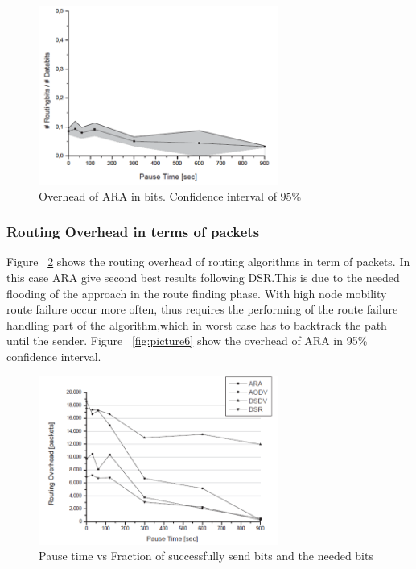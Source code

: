 \begin{figure}[t!]
\centering
\includegraphics[width=0.7\textwidth]{Picture4.png}
\caption{\label{fig:picture4}Overhead of ARA in bits. Confidence interval of 95\%}
\end{figure}



\subsubsection{Routing Overhead in terms of packets}
Figure ~\ref{fig:picture5} shows the routing overhead of routing algorithms in term of packets. In this case ARA give second best results following DSR.This is due to the needed flooding of the approach in the route finding phase. With high node mobility route failure occur more often, thus requires the
performing of the route failure handling part of the algorithm,which in worst case has to backtrack the path until
the sender. Figure ~\ref{fig:picture6} show the overhead of ARA in 95\% confidence interval.
  
\begin{figure}[t!]
\centering
\includegraphics[width=0.7\textwidth]{Picture5.png}
\caption{\label{fig:picture5}Pause time vs Fraction of successfully send bits and the needed bits}
\end{figure}

